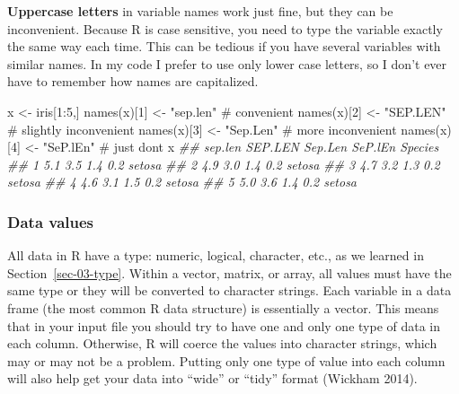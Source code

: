 \documentclass[
  13,
  letterpaper,
]{report}
\newenvironment{Shaded}{\begin{snugshade}}{\end{snugshade}}
\newcommand{\CommentTok}[1]{\textcolor[rgb]{0.37,0.37,0.37}{#1}}
\newcommand{\DecValTok}[1]{\textcolor[rgb]{0.68,0.00,0.00}{#1}}
\newcommand{\DocumentationTok}[1]{\textcolor[rgb]{0.37,0.37,0.37}{\textit{#1}}}
\newcommand{\FunctionTok}[1]{\textcolor[rgb]{0.28,0.35,0.67}{#1}}
\newcommand{\NormalTok}[1]{\textcolor[rgb]{0.00,0.23,0.31}{#1}}
\newcommand{\OtherTok}[1]{\textcolor[rgb]{0.00,0.23,0.31}{#1}}
\newcommand{\SpecialCharTok}[1]{\textcolor[rgb]{0.37,0.37,0.37}{#1}}
\newcommand{\StringTok}[1]{\textcolor[rgb]{0.13,0.47,0.30}{#1}}
\begin{document}
\textbf{Uppercase letters} in variable names work just fine, but they
can be inconvenient. Because R is case sensitive, you need to type the
variable exactly the same way each time. This can be tedious if you have
several variables with similar names. In my code I prefer to use only
lower case letters, so I don't ever have to remember how names are
capitalized.

\begin{Shaded}
\begin{Highlighting}[]
\NormalTok{x }\OtherTok{\textless{}{-}}\NormalTok{ iris[}\DecValTok{1}\SpecialCharTok{:}\DecValTok{5}\NormalTok{,]}
\FunctionTok{names}\NormalTok{(x)[}\DecValTok{1}\NormalTok{] }\OtherTok{\textless{}{-}} \StringTok{"sep.len"} \CommentTok{\# convenient}
\FunctionTok{names}\NormalTok{(x)[}\DecValTok{2}\NormalTok{] }\OtherTok{\textless{}{-}} \StringTok{"SEP.LEN"} \CommentTok{\# slightly inconvenient}
\FunctionTok{names}\NormalTok{(x)[}\DecValTok{3}\NormalTok{] }\OtherTok{\textless{}{-}} \StringTok{"Sep.Len"} \CommentTok{\# more inconvenient}
\FunctionTok{names}\NormalTok{(x)[}\DecValTok{4}\NormalTok{] }\OtherTok{\textless{}{-}} \StringTok{"SeP.lEn"} \CommentTok{\# just don\textquotesingle{}t}
\NormalTok{x}
\DocumentationTok{\#\#   sep.len SEP.LEN Sep.Len SeP.lEn Species}
\DocumentationTok{\#\# 1     5.1     3.5     1.4     0.2  setosa}
\DocumentationTok{\#\# 2     4.9     3.0     1.4     0.2  setosa}
\DocumentationTok{\#\# 3     4.7     3.2     1.3     0.2  setosa}
\DocumentationTok{\#\# 4     4.6     3.1     1.5     0.2  setosa}
\DocumentationTok{\#\# 5     5.0     3.6     1.4     0.2  setosa}
\end{Highlighting}
\end{Shaded}

\subsubsection{Data values}\label{sec-04-format-set-vars-values}

All data in R have a type: numeric, logical, character, etc., as we
learned in Section~\ref{sec-03-type}. Within a vector, matrix, or array,
all values must have the same type or they will be converted to
character strings. Each variable in a data frame (the most common R data
structure) is essentially a vector. This means that in your input file
you should try to have one and only one type of data in each column.
Otherwise, R will coerce the values into character strings, which may or
may not be a problem. Putting only one type of value into each column
will also help get your data into ``wide'' or ``tidy'' format (Wickham
2014).
\end{document}
